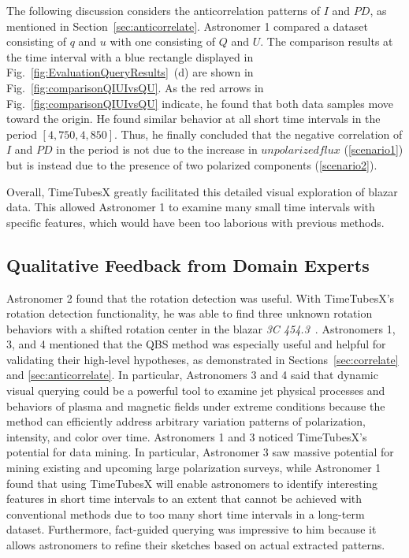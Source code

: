 The following discussion considers the anticorrelation patterns of $I$ and $PD$, as mentioned in Section~\ref{sec:anticorrelate}.
Astronomer 1 compared a dataset consisting of $q$ and $u$ with one consisting of $Q$ and $U$. The comparison results at the time interval with a blue rectangle displayed in Fig.~\ref{fig:EvaluationQueryResults}~(d) are shown in Fig.~\ref{fig:comparisonQIUIvsQU}.
As the red arrows in Fig.~\ref{fig:comparisonQIUIvsQU} indicate, 
he found that both data samples move toward the origin.
He found similar behavior at all short time intervals in the period $[4{,}750, 4{,}850]$.
Thus, he finally concluded that the negative correlation of $I$ and $PD$ in the period is not due to the increase in $unpolarized flux$ (\ref{scenario1}) but is instead due to the presence of two polarized components (\ref{scenario2}). 

Overall, TimeTubesX greatly facilitated this detailed visual exploration of blazar data. This allowed Astronomer 1 to examine many small time intervals with specific features, which would have been too laborious with previous methods.

\subsection{Qualitative Feedback from Domain Experts}\label{sec:feedback}
Astronomer 2 found that the rotation detection was useful. 
With TimeTubesX's rotation detection functionality, 
he was able to find three unknown rotation behaviors with a shifted rotation center in the blazar \emph{3C 454.3}~\cite{Huang2019}. 
Astronomers 1, 3, and 4 mentioned that the QBS method was especially useful and helpful for validating their high-level hypotheses, as demonstrated in Sections~\ref{sec:correlate} and \ref{sec:anticorrelate}. 
In particular, Astronomers 3 and 4 said that dynamic visual querying could be a powerful tool to examine jet physical processes and behaviors of plasma and magnetic fields under extreme conditions because the method can efficiently address arbitrary variation patterns of polarization, intensity, and color over time. Astronomers 1 and 3 noticed TimeTubesX’s potential for data mining. In particular, Astronomer 3 saw massive potential for mining existing and upcoming large polarization surveys, while Astronomer 1 found that using TimeTubesX will enable astronomers to identify interesting features in short time intervals to an extent that cannot be achieved with conventional methods due to too many short time intervals in a long-term dataset. Furthermore, fact-guided querying was impressive to him because it allows astronomers to refine their sketches based on actual extracted patterns.
